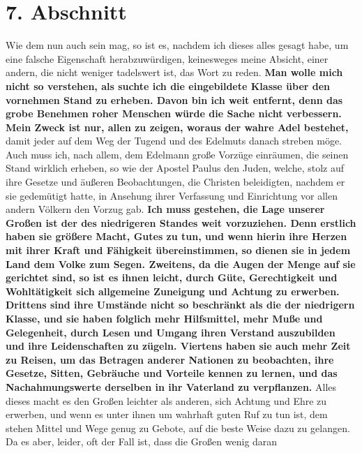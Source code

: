 \section{7. Abschnitt} \label{kap11_ab7}

Wie dem nun auch sein mag, so ist es, nachdem ich dieses alles gesagt habe, um
eine falsche Eigenschaft herabzuwürdigen, keinesweges meine Absicht, einer
andern, die nicht weniger tadelswert ist, das Wort zu reden. \textbf{Man wolle
mich
nicht so verstehen, als suchte ich die eingebildete
Klasse über den vornehmen
Stand zu erheben. Davon bin ich weit entfernt, denn das grobe
Benehmen roher
Menschen würde die Sache nicht verbessern. Mein Zweck ist nur, allen zu zeigen,
woraus der wahre Adel bestehet,} damit jeder auf dem Weg der Tugend und des
Edelmuts danach streben möge. Auch muss ich, nach allem, dem Edelmann große
Vorzüge einräumen, die seinen Stand wirklich erheben, so wie der Apostel
Paulus
den Juden, welche, stolz auf ihre Gesetze und äußeren
Beobachtungen, die Christen
beleidigten, nachdem er sie gedemütigt hatte, in Ansehung ihrer Verfassung und
Einrichtung vor allen andern Völkern den Vorzug gab.
\label{ref:11_07_standesvorteil} \textbf{Ich muss gestehen, die Lage
unserer  Großen ist der des
niedrigeren
Standes weit vorzuziehen. Denn erstlich
haben sie größere Macht, Gutes zu tun, und wenn hierin ihre Herzen mit ihrer
Kraft und Fähigkeit übereinstimmen, so dienen sie in jedem Land dem Volke zum
Segen. Zweitens, da die Augen der Menge auf sie gerichtet sind, so ist es ihnen
leicht, durch Güte, Gerechtigkeit und Wohltätigkeit sich
allgemeine Zuneigung
und Achtung zu erwerben. Drittens sind ihre Umstände nicht so beschränkt als die
der niedrigern Klasse, und sie haben folglich mehr Hilfsmittel, mehr
Muße und
Gelegenheit, durch Lesen und Umgang ihren Verstand
auszubilden und ihre
Leidenschaften zu zügeln. Viertens haben sie auch mehr Zeit zu
Reisen, um das
Betragen anderer Nationen zu beobachten, ihre Gesetze, Sitten, Gebräuche und
Vorteile kennen zu lernen, und das Nachahmungswerte derselben in ihr Vaterland
zu verpflanzen.} Alles dieses macht es den Großen leichter als anderen, sich
Achtung und Ehre zu erwerben, und wenn es unter ihnen um wahrhaft guten Ruf zu
tun ist, dem stehen Mittel und Wege genug zu Gebote, auf die beste Weise dazu
zu gelangen. Da es aber, leider, oft der Fall ist, dass die Großen wenig daran
